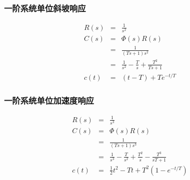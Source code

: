 \documentclass{beamer}
\begin{document}
\begin{frame}
\frametitle{一阶系统单位斜坡响应}
\label{sec-1-3}

\begin{eqnarray*}
R(s) &= & \frac{1}{s^{2}} \\
C(s) &=& \Phi(s)R(s) \\
     &=& \frac{1}{(Ts+1)s^{2}} \\
     &=& \frac{1}{s^{2}}-\frac{T}{s}+\frac{T^2}{Ts+1} \\
c(t) &=& (t-T)+Te^{-t/T}
\end{eqnarray*}
\end{frame}
\begin{frame}
\frametitle{一阶系统单位加速度响应}
\label{sec-1-4}

\begin{eqnarray*}
R(s) &= & \frac{1}{s^{3}} \\
C(s) &=& \Phi(s)R(s) \\
     &=& \frac{1}{(Ts+1)s^{3}} \\
     &=& \frac{1}{s^3}-\frac{T}{s^2}+\frac{T^2}{s}-\frac{T^3}{sT+1}\\
c(t) &=& \frac{1}{2}t^2-Tt+T^2(1-e^{-t/T})
\end{eqnarray*}
\end{frame}
\end{document}
